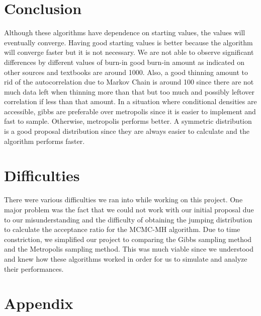 \documentclass[11pt,a4paper]{article}
\begin{document}
\section*{Conclusion}
Although these algorithms have dependence on starting values, the values will eventually converge. Having good starting values is better because the algorithm will converge faster but it is not necessary. We are not able to observe significant differences by different values of burn-in good burn-in amount as indicated on other sources and textbooks are around 1000. Also, a good thinning amount to rid of the autocorrelation due to Markov Chain is around 100 since there are not much data left when thinning more than that but too much and possibly leftover correlation if less than that amount. In a situation where conditional densities are accessible, gibbs are preferable over metropolis since it is easier to implement and fast to sample. Otherwise, metropolis performs better. A symmetric distribution is a good proposal distribution since they are always easier to calculate and the algorithm performs faster. 


\section*{Difficulties}
There were various difficulties we ran into while working on this project. One major problem was the fact that we could not work with our initial proposal due to our misunderstanding and the difficulty of obtaining the jumping distribution to calculate the acceptance ratio for the MCMC-MH algorithm. Due to time constriction, we simplified our project to comparing the Gibbs sampling method and the Metropolis sampling method. This was much viable since we understood and knew how these algorithms worked in order for us to simulate and analyze their performances. 


\newpage

\section*{Appendix}

\end{document}
